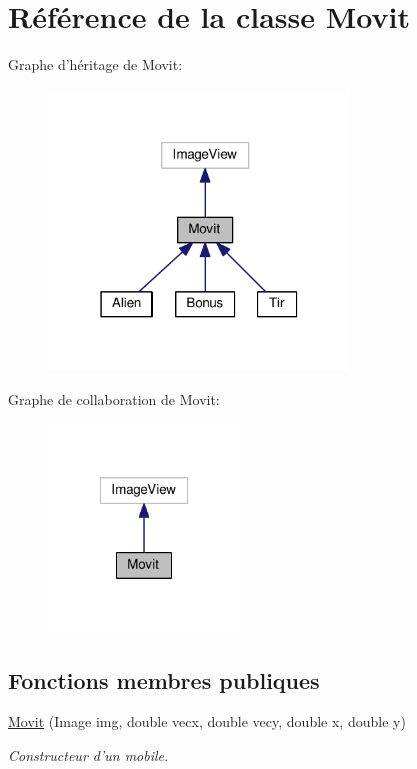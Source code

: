 \hypertarget{class_movit}{\section{Référence de la classe Movit}
\label{class_movit}
}


Graphe d'héritage de Movit\-:
\nopagebreak
\begin{figure}[H]
\begin{center}
\leavevmode
\includegraphics[width=226pt]{class_movit__inherit__graph}
\end{center}
\end{figure}


Graphe de collaboration de Movit\-:
\nopagebreak
\begin{figure}[H]
\begin{center}
\leavevmode
\includegraphics[width=144pt]{class_movit__coll__graph}
\end{center}
\end{figure}
\subsection*{Fonctions membres publiques}
\begin{DoxyCompactItemize}
\item 
\hyperlink{class_movit_a49b9f207b93ff26c86f63a70882e68de}{Movit} (Image img, double vecx, double vecy, double x, double y)
\begin{DoxyCompactList}\small\item\em Constructeur d'un mobile. \end{DoxyCompactList}\end{DoxyCompactItemize}
